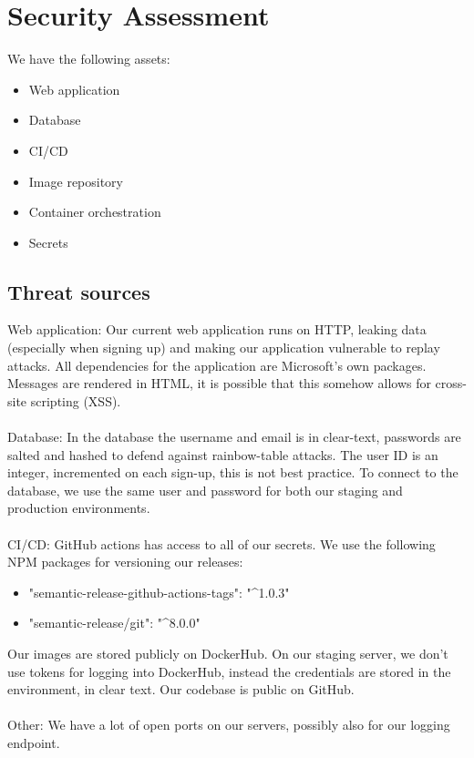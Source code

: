 \section{Security Assessment}
We have the following assets:
\begin{itemize}
    \item Web application
    \item Database
    \item CI/CD
    \item Image repository
    \item Container orchestration
    \item Secrets
\end{itemize}

\subsection{Threat sources}

Web application: Our current web application runs on HTTP, leaking data (especially when signing up) and making our application vulnerable to replay attacks. 
All dependencies for the application are Microsoft's own packages.
Messages are rendered in HTML, it is possible that this somehow allows for cross-site scripting (XSS).\\\\
Database: In the database the username and email is in clear-text, passwords are salted and hashed to defend against rainbow-table attacks.
The user ID is an integer, incremented on each sign-up, this is not best practice.
To connect to the database, we use the same user and password for both our staging and production environments.\\\\
CI/CD: GitHub actions has access to all of our secrets.
We use the following NPM packages for versioning our releases:
\begin{itemize}
    \item "semantic-release-github-actions-tags": "\textasciicircum1.0.3"
    \item "semantic-release/git": "\textasciicircum8.0.0"
\end{itemize}

Our images are stored publicly on DockerHub.
On our staging server, we don’t use tokens for logging into DockerHub, instead the credentials are stored in the environment, in clear text.
Our codebase is public on GitHub.\\\\
Other: We have a lot of open ports on our servers, possibly also for our logging endpoint.

